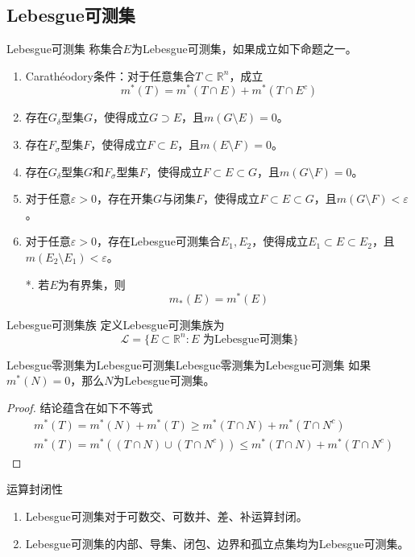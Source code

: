 \documentclass[lang = cn, scheme = chinese, thmcnt = section]{elegantbook}
\newcommand{\R}{\mathbb{R}}            %
\newcommand{\sub}{\subset}             %
\begin{document}
\subsection{Lebesgue可测集}

\begin{definition}{Lebesgue可测集}
	称集合$E$为Lebesgue可测集，如果成立如下命题之一。
	\begin{enumerate}
		\item Carathéodory条件：对于任意集合$T\sub\R^n$，成立
		$$
		m^*(T)=m^*(T\cap E)+m^*(T\cap E^c)
		$$
		\item 存在$G_\delta$型集$G$，使得成立$G\supset E$，且$m(G\setminus E)=0$。
		\item 存在$F_\sigma$型集$F$，使得成立$F\sub E$，且$m(E\setminus F)=0$。
		\item 存在$G_\delta$型集$G$和$F_\sigma$型集$F$，使得成立$F\sub E\sub G$，且$m(G\setminus F)=0$。
		\item 对于任意$\varepsilon>0$，存在开集$G$与闭集$F$，使得成立$F\sub E\sub G$，且$m(G\setminus F)<\varepsilon$。
		\item 对于任意$\varepsilon>0$，存在Lebesgue可测集合$E_1,E_2$，使得成立$E_1\sub E\sub E_2$，且$m(E_2\setminus E_1)<\varepsilon$。
		\item[*.] 若$E$为有界集，则%
		$$
		m_*(E)=m^*(E)
		$$
	\end{enumerate}
\end{definition}

\begin{definition}{Lebesgue可测集族}
	定义Lebesgue可测集族为
	$$
	\mathscr{L}=\{ E\sub\R^n:E\text{ 为Lebesgue可测集} \}
	$$
\end{definition}

\begin{theorem}{Lebesgue零测集为Lebesgue可测集}{Lebesgue零测集为Lebesgue可测集}
	如果$m^*(N)=0$，那么$N$为Lebesgue可测集。
\end{theorem}

\begin{proof}
	结论蕴含在如下不等式
	\begin{align*}
		& m^*(T)=m^*(N)+m^*(T)\ge m^*(T\cap N)+m^*(T\cap N^c)\\
		& m^*(T)=m^*((T\cap N)\cup(T\cap N^c))\le m^*(T\cap N)+m^*(T\cap N^c)
	\end{align*}
\end{proof}

\begin{theorem}{运算封闭性}
	\begin{enumerate}
		\item Lebesgue可测集对于可数交、可数并、差、补运算封闭。
		\item Lebesgue可测集的内部、导集、闭包、边界和孤立点集均为Lebesgue可测集。
	\end{enumerate}
\end{theorem}
\end{document}

